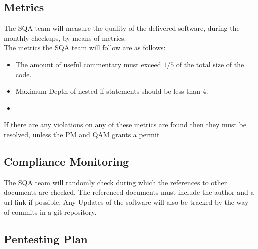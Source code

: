 \documentclass{report}
\begin{document}
\subsection{Metrics}
The SQA team will measure the quality of the delivered software, during the monthly checkups, by means of metrics. \\
The metrics the SQA team will follow are as follows:
\begin{itemize}
\item The amount of useful commentary must exceed $1/5$ of the total size of the code.
\item Maximum Depth of nested if-statements should be less than 4.
\item 
\end{itemize}
If there are any violations on any of these metrics are found then they must be resolved, unless the PM and QAM grants a permit

\subsection{Compliance Monitoring}
The SQA team will randomly check during which the references to other documents are checked. The referenced documents must include the author and a url link if possible. Any Updates of the software will also be tracked by the way of commits in a git repository. 

\subsection{Pentesting Plan}

\newpage
\end{document}
